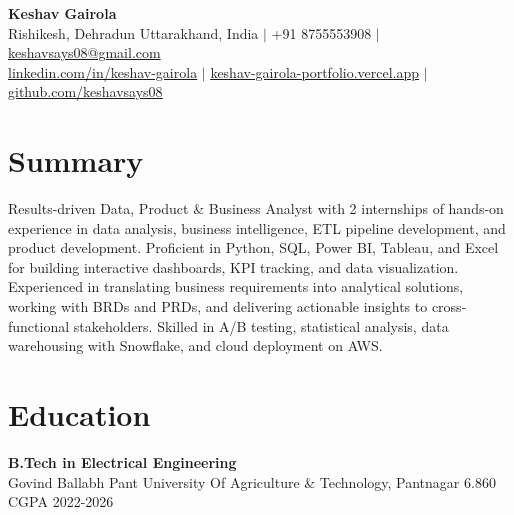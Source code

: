 \documentclass[9pt]{article}
\begin{document}
\begin{center}
    {\LARGE \textbf{Keshav Gairola}} \\
    \vspace{2pt}
    Rishikesh, Dehradun Uttarakhand, India $|$ +91 8755553908 $|$ 
    \href{mailto:keshavsays08@gmail.com}{{\color{black} keshavsays08@gmail.com}} \\
    \vspace{1pt}
    \href{https://www.linkedin.com/in/keshav-gairola/}{{\color{blue} \underline{linkedin.com/in/keshav-gairola}}} $|$ 
    \href{https://keshav-gairola-portfolio.vercel.app/}{{\color{blue} \underline{keshav-gairola-portfolio.vercel.app}}} $|$
    \href{https://github.com/keshavsays08/}{{\color{blue} \underline{github.com/keshavsays08}}}
\end{center}

\section*{Summary}
{\small Results-driven Data, Product \& Business Analyst with 2 internships of hands-on experience in data analysis, business intelligence, ETL pipeline development, and product development. Proficient in Python, SQL, Power BI, Tableau, and Excel for building interactive dashboards, KPI tracking, and data visualization. Experienced in translating business requirements into analytical solutions, working with BRDs and PRDs, and delivering actionable insights to cross-functional stakeholders. Skilled in A/B testing, statistical analysis, data warehousing with Snowflake, and cloud deployment on AWS.}

\section*{Education}


{\noindent \bf B.Tech in Electrical Engineering} \\
Govind Ballabh Pant University Of Agriculture \& Technology, Pantnagar \hfill {6.860 CGPA \hspace{1.9cm}2022-2026}
\end{document}
